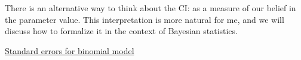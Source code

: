 There is an alternative way to think about the CI: as a measure of our belief in the parameter value. This interpretation is more natural for me, and we will discuss how to formalize it in the context of Bayesian statistics. 











\begin{exercise}
\href{https://colab.research.google.com/drive/1QarJhwPmSqCTQ-HwU_lXCUX6uvdhLdrM#scrollTo=jmB0Mvksc6B_&line=1&uniqifier=1}{Standard errors for binomial model}
\end{exercise} 




